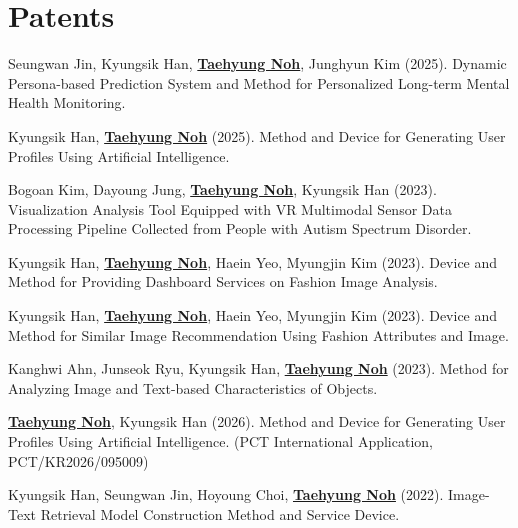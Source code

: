 \documentclass[a4paper,11pt]{article}
\begin{document}
\section{\textbf{Patents}}
\vspace{0.2mm}
\small{
\begin{enumerate}[leftmargin=*, labelsep=0.5em, align=left, widest={[\textbf{P.1}]}, itemindent=0em, label={\textbf{[P.\arabic*]}}]

\item Seungwan Jin, Kyungsik Han, \underline{\textbf{Taehyung Noh}}, Junghyun Kim (2025). Dynamic Persona-based Prediction System and Method for Personalized Long-term Mental Health Monitoring.

\item Kyungsik Han, \underline{\textbf{Taehyung Noh}} (2025). Method and Device for Generating User Profiles Using Artificial Intelligence.

\item Bogoan Kim, Dayoung Jung, \underline{\textbf{Taehyung Noh}}, Kyungsik Han (2023). Visualization Analysis Tool Equipped with VR Multimodal Sensor Data Processing Pipeline Collected from People with Autism Spectrum Disorder.

\item Kyungsik Han, \underline{\textbf{Taehyung Noh}}, Haein Yeo, Myungjin Kim (2023). Device and Method for Providing Dashboard Services on Fashion Image Analysis.

\item Kyungsik Han, \underline{\textbf{Taehyung Noh}}, Haein Yeo, Myungjin Kim (2023). Device and Method for Similar Image Recommendation Using Fashion Attributes and Image.

\item Kanghwi Ahn, Junseok Ryu, Kyungsik Han, \underline{\textbf{Taehyung Noh}} (2023). Method for Analyzing Image and Text-based Characteristics of Objects.

\item \underline{\textbf{Taehyung Noh}}, Kyungsik Han (2026). Method and Device for Generating User Profiles Using Artificial Intelligence. (PCT International Application, PCT/KR2026/095009)

\item Kyungsik Han, Seungwan Jin, Hoyoung Choi, \underline{\textbf{Taehyung Noh}} (2022). Image-Text Retrieval Model Construction Method and Service Device.

\end{enumerate}
}
\end{document}
